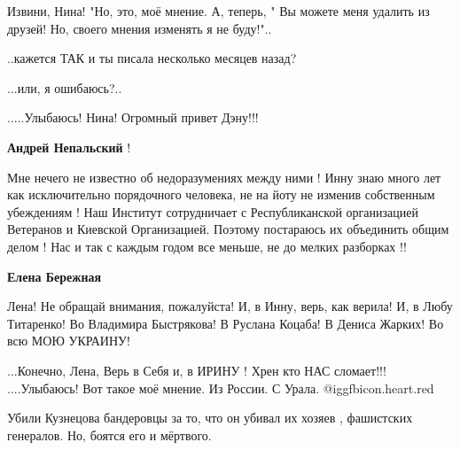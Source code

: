 \begin{itemize}
Извини, Нина! "Но, это, моё мнение. А, теперь, " Вы можете меня удалить из
друзей! Но, своего мнения изменять я не буду!"..

..кажется ТАК и ты писала несколько месяцев назад?

...или, я ошибаюсь?..

.....Улыбаюсь! Нина! Огромный привет Дэну!!!

\begin{itemize} %
\textbf{Андрей Непальский} ! 

Мне нечего не известно об недоразумениях между ними ! Инну знаю много лет как
исключительно порядочного человека, не на йоту не изменив собственным
убеждениям ! Наш Институт сотрудничает с Республиканской организацией Ветеранов
и Киевской Организацией. Поэтому постараюсь их объединить общим делом ! Нас и
так с каждым годом все меньше, не до мелких разборках !!

\textbf{Елена Бережная} 

Лена! Не обращай внимания, пожалуйста! И, в Инну, верь, как верила! И, в Любу
Титаренко! Во Владимира Быстрякова! В Руслана Коцаба! В Дениса Жарких! Во всю
МОЮ УКРАИНУ!

...Конечно, Лена, Верь в Себя и, в ИРИНУ ! Хрен кто НАС сломает!!!
....Улыбаюсь! Вот такое моё мнение. Из России. С Урала.
@igg{fbicon.heart.red}
\end{itemize} %


Убили Кузнецова бандеровцы за то, что он убивал их хозяев , фашистских
генералов. Но, боятся его и мёртвого.

\end{itemize} %
